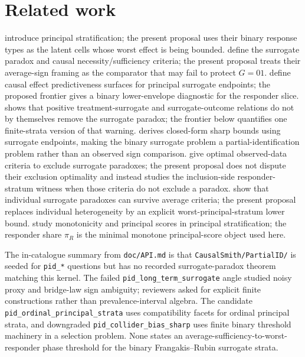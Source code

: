 \documentclass[11pt]{article}
\theoremstyle{definition}
\theoremstyle{plain}
\theoremstyle{remark}
\begin{document}
\section{Related work}
\citet[p.~24, Definition 1]{FrangakisRubin2002} introduce principal stratification; the present proposal uses their binary response types as the latent cells whose worst effect is being bounded.  \citet[p.~919, Summary]{ChenGengJia2007} define the surrogate paradox and causal necessity/sufficiency criteria; the present proposal treats their average-sign framing as the comparator that may fail to protect \(G=01\).  \citet{GilbertHudgens2008} define causal effect predictiveness surfaces for principal surrogate endpoints; the proposed frontier gives a binary lower-envelope diagnostic for the responder slice.  \citet[p.~561, abstract; p.~562, Definition 1]{VanderWeele2013} shows that positive treatment-surrogate and surrogate-outcome relations do not by themselves remove the surrogate paradox; the frontier below quantifies one finite-strata version of that warning.  \citet[p.~4338, abstract; pp.~4339--4340, Section 2]{Kuroki2013} derives closed-form sharp bounds using surrogate endpoints, making the binary surrogate problem a partial-identification problem rather than an observed sign comparison.  \citet[pp.~84--85, Introduction; p.~88, Theorem 1]{YinLiuGengLuo2020} give optimal observed-data criteria to exclude surrogate paradoxes; the present proposal does not dispute their exclusion optimality and instead studies the inclusion-side responder-stratum witness when those criteria do not exclude a paradox.  \citet[p.~97, abstract; p.~99, Section 2]{MaYinLiuGeng2021} show that individual surrogate paradoxes can survive average criteria; the present proposal replaces individual heterogeneity by an explicit worst-principal-stratum lower bound.  \citet{DingLu2017} study monotonicity and principal scores in principal stratification; the responder share \(\pi_R\) is the minimal monotone principal-score object used here.

The in-catalogue summary from \texttt{doc/API.md} is that \texttt{CausalSmith/PartialID/} is seeded for \texttt{pid\_*} questions but has no recorded surrogate-paradox theorem matching this kernel.  The failed \texttt{pid\_long\_term\_surrogate} angle studied noisy proxy and bridge-law sign ambiguity; reviewers asked for explicit finite constructions rather than prevalence-interval algebra.  The candidate \texttt{pid\_ordinal\_principal\_strata} uses compatibility facets for ordinal principal strata, and downgraded \texttt{pid\_collider\_bias\_sharp} uses finite binary threshold machinery in a selection problem.  None states an average-sufficiency-to-worst-responder phase threshold for the binary Frangakis--Rubin surrogate strata.
\end{document}
